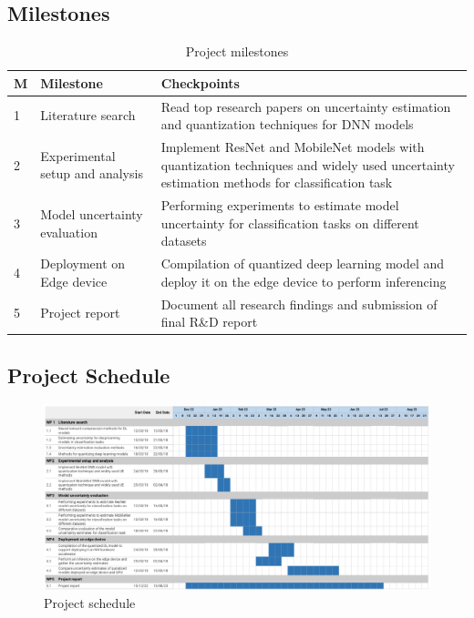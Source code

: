 \documentclass[rnd]{mas_proposal}
\begin{document}
\subsection{Milestones}
    \begin{table}[H]
       \begin{tabular}{|m{0.35cm}|m{4cm}|m{9cm}|}
       \hline
       \textbf{M} & \textbf{Milestone} & \textbf{Checkpoints} \\
       \hline
       1 & Literature search & Read top research papers on uncertainty estimation and quantization techniques for DNN models\\
       \hline
       2 & Experimental setup and analysis & Implement ResNet and MobileNet models with quantization techniques and widely used uncertainty estimation methods for classification task\\
       \hline
       3 & Model uncertainty evaluation  &  Performing experiments to estimate model uncertainty for classification tasks on different datasets\\
       \hline
       4 & Deployment on Edge device & Compilation of quantized deep learning model and deploy it on the edge device to perform inferencing\\
       \hline
       5 & Project report & Document all research findings and submission of final R\&D report\\
       \hline
       \end{tabular}
        \caption{Project milestones}
        \label{tab:my_label}
    \end{table}


\subsection{Project Schedule}
\begin{figure}[h!]
    \includegraphics[width=\textwidth]{images/R&D Gantt Chart_V2.png}
    \caption{Project schedule}
    \label{fig:myfigure}
\end{figure}
\end{document}
